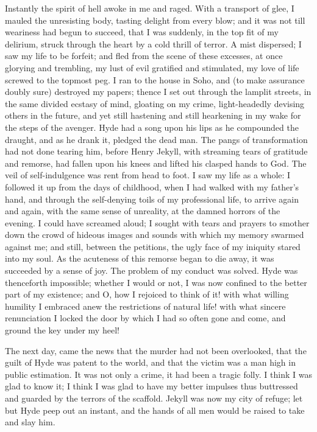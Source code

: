 \documentclass[12pt,openright]{book}
\begin{document}
Instantly the spirit of hell awoke in me and raged. With a transport of glee, I mauled the unresisting body, tasting delight from every blow; and it was not till weariness had begun to succeed, that I was suddenly, in the top fit of my delirium, struck through the heart by a cold thrill of terror. A mist dispersed; I saw my life to be forfeit; and fled from the scene of these excesses, at once glorying and trembling, my lust of evil gratified and stimulated, my love of life screwed to the topmost peg. I ran to the house in Soho, and (to make assurance doubly sure) destroyed my papers; thence I set out through the lamplit streets, in the same divided ecstasy of mind, gloating on my crime, light-headedly devising others in the future, and yet still hastening and still hearkening in my wake for the steps of the avenger. Hyde had a song upon his lips as he compounded the draught, and as he drank it, pledged the dead man. The pangs of transformation had not done tearing him, before Henry Jekyll, with streaming tears of gratitude and remorse, had fallen upon his knees and lifted his clasped hands to God. The veil of self-indulgence was rent from head to foot. I saw my life as a whole: I followed it up from the days of childhood, when I had walked with my father’s hand, and through the self-denying toils of my professional life, to arrive again and again, with the same sense of unreality, at the damned horrors of the evening. I could have screamed aloud; I sought with tears and prayers to smother down the crowd of hideous images and sounds with which my memory swarmed against me; and still, between the petitions, the ugly face of my iniquity stared into my soul. As the acuteness of this remorse began to die away, it was succeeded by a sense of joy. The problem of my conduct was solved. Hyde was thenceforth impossible; whether I would or not, I was now confined to the better part of my existence; and O, how I rejoiced to think of it! with what willing humility I embraced anew the restrictions of natural life! with what sincere renunciation I locked the door by which I had so often gone and come, and ground the key under my heel!

The next day, came the news that the murder had not been overlooked, that the guilt of Hyde was patent to the world, and that the victim was a man high in public estimation. It was not only a crime, it had been a tragic folly. I think I was glad to know it; I think I was glad to have my better impulses thus buttressed and guarded by the terrors of the scaffold. Jekyll was now my city of refuge; let but Hyde peep out an instant, and the hands of all men would be raised to take and slay him.
\end{document}
